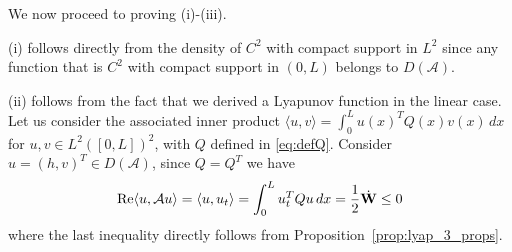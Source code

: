 \documentclass[11pt]{article}
\begin{document}
We now proceed to proving (i)-(iii).

(i) follows directly from the density of $C^{2}$ with compact support in $L^{2}$ since any function that is $C^{2}$ with compact support in $(0,L)$ belongs to $D(\mathcal{A})$. 

(ii) follows from the fact that we derived a Lyapunov function in the linear case. Let us consider the associated inner product $\langle u, v \rangle = \int_{0}^{L} u(x)^T Q(x) v(x) \, dx$ for $u,v \in L^2([0,L])^2$, with $Q$ defined in \eqref{eq:defQ}. Consider $u = (h, v)^T \in D(\mathcal{A})$, since $Q = Q^T$ we have 
\begin{equation}
    \text{Re} \langle u, \mathcal{A}u \rangle = \langle u, u_t \rangle = \int_0^L u_t^T Q u \, dx = \frac{1}{2} \dot{\bf{{W}}} \leq 0
\end{equation} where the last inequality directly follows from Proposition~\ref{prop:lyap_3_props}.
\end{document}
